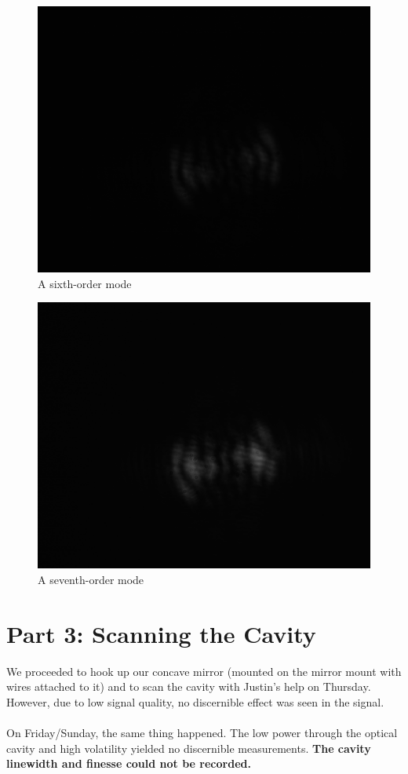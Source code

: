\documentclass[10pt,a4paper]{article}
\begin{document}
\begin{figure}[H]
\centering
\includegraphics[width=\textwidth]{../Analysis/Lab5Mode3.png}
\caption{A sixth-order mode}
\end{figure} 
\begin{figure}[H]
\centering
\includegraphics[width=\textwidth]{../Analysis/Lab5Mode1.png}
\caption{A seventh-order mode}
\end{figure}
\section*{Part 3: Scanning the Cavity}
We proceeded to hook up our concave mirror (mounted on the mirror mount with wires attached to it) and to scan the cavity with Justin's help on Thursday. However, due to low signal quality, no discernible effect was seen in the signal.\\
\\
On Friday/Sunday, the same thing happened. The low power through the optical cavity and high volatility yielded no discernible measurements. \textbf{The cavity linewidth and finesse could not be recorded.}
\end{document}
